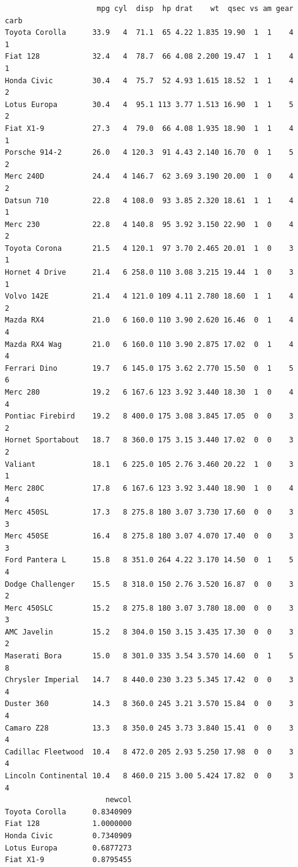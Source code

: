 \documentclass[
]{article}
\begin{document}
\begin{verbatim}
                     mpg cyl  disp  hp drat    wt  qsec vs am gear carb
Toyota Corolla      33.9   4  71.1  65 4.22 1.835 19.90  1  1    4    1
Fiat 128            32.4   4  78.7  66 4.08 2.200 19.47  1  1    4    1
Honda Civic         30.4   4  75.7  52 4.93 1.615 18.52  1  1    4    2
Lotus Europa        30.4   4  95.1 113 3.77 1.513 16.90  1  1    5    2
Fiat X1-9           27.3   4  79.0  66 4.08 1.935 18.90  1  1    4    1
Porsche 914-2       26.0   4 120.3  91 4.43 2.140 16.70  0  1    5    2
Merc 240D           24.4   4 146.7  62 3.69 3.190 20.00  1  0    4    2
Datsun 710          22.8   4 108.0  93 3.85 2.320 18.61  1  1    4    1
Merc 230            22.8   4 140.8  95 3.92 3.150 22.90  1  0    4    2
Toyota Corona       21.5   4 120.1  97 3.70 2.465 20.01  1  0    3    1
Hornet 4 Drive      21.4   6 258.0 110 3.08 3.215 19.44  1  0    3    1
Volvo 142E          21.4   4 121.0 109 4.11 2.780 18.60  1  1    4    2
Mazda RX4           21.0   6 160.0 110 3.90 2.620 16.46  0  1    4    4
Mazda RX4 Wag       21.0   6 160.0 110 3.90 2.875 17.02  0  1    4    4
Ferrari Dino        19.7   6 145.0 175 3.62 2.770 15.50  0  1    5    6
Merc 280            19.2   6 167.6 123 3.92 3.440 18.30  1  0    4    4
Pontiac Firebird    19.2   8 400.0 175 3.08 3.845 17.05  0  0    3    2
Hornet Sportabout   18.7   8 360.0 175 3.15 3.440 17.02  0  0    3    2
Valiant             18.1   6 225.0 105 2.76 3.460 20.22  1  0    3    1
Merc 280C           17.8   6 167.6 123 3.92 3.440 18.90  1  0    4    4
Merc 450SL          17.3   8 275.8 180 3.07 3.730 17.60  0  0    3    3
Merc 450SE          16.4   8 275.8 180 3.07 4.070 17.40  0  0    3    3
Ford Pantera L      15.8   8 351.0 264 4.22 3.170 14.50  0  1    5    4
Dodge Challenger    15.5   8 318.0 150 2.76 3.520 16.87  0  0    3    2
Merc 450SLC         15.2   8 275.8 180 3.07 3.780 18.00  0  0    3    3
AMC Javelin         15.2   8 304.0 150 3.15 3.435 17.30  0  0    3    2
Maserati Bora       15.0   8 301.0 335 3.54 3.570 14.60  0  1    5    8
Chrysler Imperial   14.7   8 440.0 230 3.23 5.345 17.42  0  0    3    4
Duster 360          14.3   8 360.0 245 3.21 3.570 15.84  0  0    3    4
Camaro Z28          13.3   8 350.0 245 3.73 3.840 15.41  0  0    3    4
Cadillac Fleetwood  10.4   8 472.0 205 2.93 5.250 17.98  0  0    3    4
Lincoln Continental 10.4   8 460.0 215 3.00 5.424 17.82  0  0    3    4
                       newcol
Toyota Corolla      0.8340909
Fiat 128            1.0000000
Honda Civic         0.7340909
Lotus Europa        0.6877273
Fiat X1-9           0.8795455

\end{verbatim}
\end{document}
